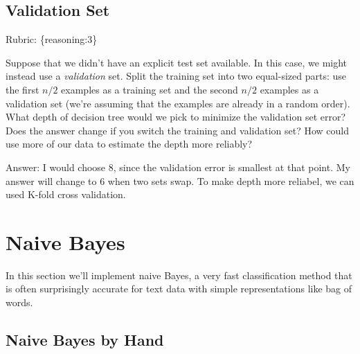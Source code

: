 \documentclass{article}
\def\rubric#1{\gre{Rubric: \{#1\}}}{}
\def\ans#1{\par\gre{Answer: #1}}
\def\blu#1{{\color{blu}#1}}
\def\gre#1{{\color{gre}#1}}
\begin{document}
\subsection{Validation Set}
\rubric{reasoning:3}

Suppose that we didn't have an explicit test set available. In this case, we might instead use a \emph{validation} set. Split the training set into two equal-sized parts: use the first $n/2$ examples as a training set and the second $n/2$ examples as a validation set (we're assuming that the examples are already in a random order). \blu{What depth of decision tree would we pick to minimize the validation set error? Does the answer change if you switch the training and validation set? How could use more of our data to  estimate the depth more reliably?}
\ans{I would choose 8, since the validation error is smallest at that point. My answer will change to 6 when two sets swap. To make depth more reliabel, we can used K-fold cross validation.}

\section{Naive Bayes}

In this section we'll implement naive Bayes, a very fast classification method that is often surprisingly accurate for text data with simple representations like bag of words.



\subsection{Naive Bayes by Hand}
\end{document}
